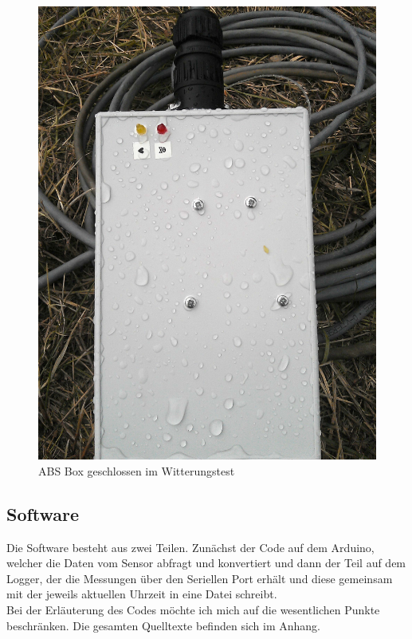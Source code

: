 \documentclass[12pt,a4paper]{scrartcl}
\begin{document}
\begin{figure}[H]
\begin{minipage}[H]{8cm}
	\includegraphics[scale=.111]{hardwareimages/arduinoboxregen.jpg}
	\caption{ABS Box geschlossen im Witterungstest}
	\label{arduinoboxregen}
\end{minipage}
\end{figure}


\subsection{Software} 

Die Software besteht aus zwei Teilen. Zunächst der Code auf dem Arduino, welcher die Daten vom Sensor abfragt und konvertiert und dann der Teil auf dem Logger, der die Messungen über den Seriellen Port erhält und diese gemeinsam mit der jeweils aktuellen Uhrzeit in eine Datei schreibt.\\

Bei der Erläuterung des Codes möchte ich mich auf die wesentlichen Punkte beschränken. Die gesamten Quelltexte befinden sich im Anhang.
\end{document}
